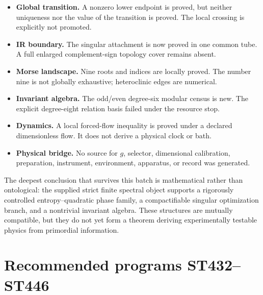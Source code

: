 \documentclass[11pt,a4paper]{article}
\begin{document}
\begin{itemize}[leftmargin=1.5em]
\item \textbf{Global transition.}  A nonzero lower endpoint is proved, but
neither uniqueness nor the value of the transition is proved.  The local
crossing is explicitly not promoted.
\item \textbf{IR boundary.}  The singular attachment is now proved in one
common tube.  A full enlarged complement-sign topology cover remains absent.
\item \textbf{Morse landscape.}  Nine roots and indices are locally proved.
The number nine is not globally exhaustive; heteroclinic edges are numerical.
\item \textbf{Invariant algebra.}  The odd/even degree-six modular census is
new.  The explicit degree-eight relation basis failed under the resource stop.
\item \textbf{Dynamics.}  A local forced-flow inequality is proved under a
declared dimensionless flow.  It does not derive a physical clock or bath.
\item \textbf{Physical bridge.}  No source for $g$, selector, dimensional
calibration, preparation, instrument, environment, apparatus, or record was
generated.
\end{itemize}

The deepest conclusion that survives this batch is mathematical rather than
ontological: the supplied strict finite spectral object supports a rigorously
controlled entropy--quadratic phase family, a compactifiable singular
optimization branch, and a nontrivial invariant algebra.  These structures
are mutually compatible, but they do not yet form a theorem deriving
experimentally testable physics from primordial information.

\section{Recommended programs ST432--ST446}
\end{document}
